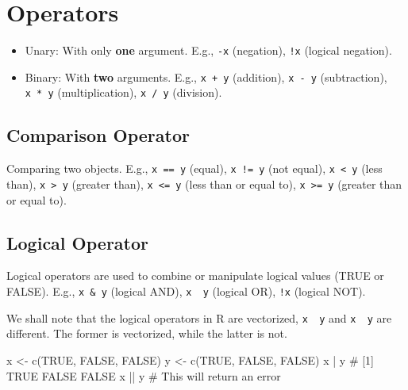 \documentclass[
  letterpaper,
  DIV=11,
  numbers=noendperiod]{scrreprt}
\newenvironment{Shaded}{\begin{snugshade}}{\end{snugshade}}
\newcommand{\CommentTok}[1]{\textcolor[rgb]{0.37,0.37,0.37}{#1}}
\newcommand{\ConstantTok}[1]{\textcolor[rgb]{0.56,0.35,0.01}{#1}}
\newcommand{\FunctionTok}[1]{\textcolor[rgb]{0.28,0.35,0.67}{#1}}
\newcommand{\NormalTok}[1]{\textcolor[rgb]{0.00,0.23,0.31}{#1}}
\newcommand{\OtherTok}[1]{\textcolor[rgb]{0.00,0.23,0.31}{#1}}
\newcommand{\SpecialCharTok}[1]{\textcolor[rgb]{0.37,0.37,0.37}{#1}}
\begin{document}
\section{Operators}\label{operators}

\begin{itemize}
\item
  Unary: With only \textbf{one} argument. E.g., \texttt{-x} (negation),
  \texttt{!x} (logical negation).
\item
  Binary: With \textbf{two} arguments. E.g., \texttt{x\ +\ y}
  (addition), \texttt{x\ -\ y} (subtraction), \texttt{x\ *\ y}
  (multiplication), \texttt{x\ /\ y} (division).
\end{itemize}

\subsection{Comparison Operator}\label{comparison-operator}

Comparing two objects. E.g., \texttt{x\ ==\ y} (equal),
\texttt{x\ !=\ y} (not equal), \texttt{x\ \textless{}\ y} (less than),
\texttt{x\ \textgreater{}\ y} (greater than),
\texttt{x\ \textless{}=\ y} (less than or equal to),
\texttt{x\ \textgreater{}=\ y} (greater than or equal to).

\subsection{Logical Operator}\label{logical-operator}

Logical operators are used to combine or manipulate logical values (TRUE
or FALSE). E.g., \texttt{x\ \&\ y} (logical AND),
\texttt{x\ \textbar{}\ y} (logical OR), \texttt{!x} (logical NOT).

We shall note that the logical operators in R are vectorized,
\texttt{x\ \textbar{}\ y} and \texttt{x\ \textbar{}\textbar{}\ y} are
different. The former is vectorized, while the latter is not.

\begin{Shaded}
\begin{Highlighting}[]
\NormalTok{x }\OtherTok{\textless{}{-}} \FunctionTok{c}\NormalTok{(}\ConstantTok{TRUE}\NormalTok{, }\ConstantTok{FALSE}\NormalTok{, }\ConstantTok{FALSE}\NormalTok{)}
\NormalTok{y }\OtherTok{\textless{}{-}} \FunctionTok{c}\NormalTok{(}\ConstantTok{TRUE}\NormalTok{, }\ConstantTok{FALSE}\NormalTok{, }\ConstantTok{FALSE}\NormalTok{)}
\NormalTok{x }\SpecialCharTok{|}\NormalTok{ y  }\CommentTok{\# [1]  TRUE FALSE FALSE}
\NormalTok{x }\SpecialCharTok{||}\NormalTok{ y }\CommentTok{\# This will return an error}
\end{Highlighting}
\end{Shaded}
\end{document}
